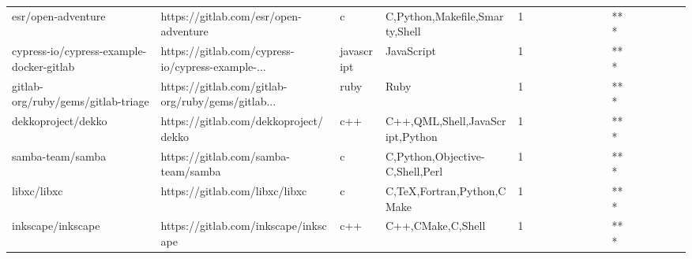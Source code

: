 \begin{tabular}{llllrlllllllllllll}
esr/open-adventure                                 &              https://gitlab.com/esr/open-adventure &                 c &                     C,Python,Makefile,Smarty,Shell &       1 &         &        &           &                &                 &        &           &       *** &          &          &       &              &          \\
cypress-io/cypress-example-docker-gitlab           &  https://gitlab.com/cypress-io/cypress-example-... &        javascript &                                         JavaScript &       1 &         &        &           &                &                 &        &           &       *** &          &          &       &              &          \\
gitlab-org/ruby/gems/gitlab-triage                 &  https://gitlab.com/gitlab-org/ruby/gems/gitlab... &              ruby &                                               Ruby &       1 &         &        &           &                &                 &        &           &       *** &          &          &       &              &          \\
dekkoproject/dekko                                 &              https://gitlab.com/dekkoproject/dekko &               c++ &                    C++,QML,Shell,JavaScript,Python &       1 &         &        &           &                &                 &        &           &       *** &          &          &       &              &          \\
samba-team/samba                                   &                https://gitlab.com/samba-team/samba &                 c &                    C,Python,Objective-C,Shell,Perl &       1 &         &        &           &                &                 &        &           &       *** &          &          &       &              &          \\
libxc/libxc                                        &                     https://gitlab.com/libxc/libxc &                 c &                         C,TeX,Fortran,Python,CMake &       1 &         &        &           &                &                 &        &           &       *** &          &          &       &              &          \\
inkscape/inkscape                                  &               https://gitlab.com/inkscape/inkscape &               c++ &                                  C++,CMake,C,Shell &       1 &         &        &           &                &                 &        &           &       *** &          &          &       &              &          \\

\end{tabular}
